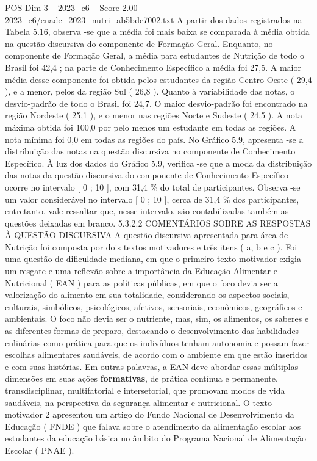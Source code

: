 \begin{textsample}{POS Dim 3 – 2023\_c6 – Score 2.00 – 2023\_c6/enade\_2023\_nutri\_ab5bde7002.txt}
A partir dos dados registrados na Tabela 5.16, observa -se que a média foi mais baixa se comparada à média obtida na questão discursiva do componente de Formação Geral.
Enquanto, no componente de Formação Geral, a média para estudantes de Nutrição de todo o Brasil foi 42,4 ; na parte de Conhecimento Específico a média foi 27,5.
A maior média desse componente foi obtida pelos estudantes da região Centro-Oeste ( 29,4 ), e a menor, pelos da região Sul ( 26,8 ).
Quanto à variabilidade das notas, o desvio-padrão de todo o Brasil foi 24,7.
O maior desvio-padrão foi encontrado na região Nordeste ( 25,1 ), e o menor nas regiões Norte e Sudeste ( 24,5 ).
A nota máxima obtida foi 100,0 por pelo menos um estudante em todas as regiões.
A nota mínima foi 0,0 em todas as regiões do país.
No Gráfico 5.9, apresenta -se a distribuição das notas na questão discursiva no componente de Conhecimento Específico.
À luz dos dados do Gráfico 5.9, verifica -se que a moda da distribuição das notas da questão discursiva do componente de Conhecimento Específico ocorre no intervalo [ 0 ; 10 ], com 31,4 \% do total de participantes.
Observa -se um valor considerável no intervalo [ 0 ; 10 ], cerca de 31,4 \% dos participantes, entretanto, vale ressaltar que, nesse intervalo, são contabilizadas também as questões deixadas em branco. 5.3.2.2 COMENTÁRIOS SOBRE AS RESPOSTAS À QUESTÃO DISCURSIVA A questão discursiva apresentada para área de Nutrição foi composta por dois textos motivadores e três itens ( a, b e c ).
Foi uma questão de dificuldade mediana, em que o primeiro texto motivador exigia um resgate e uma reflexão sobre a importância da Educação Alimentar e Nutricional ( EAN ) para as políticas públicas, em que o foco devia ser a valorização do alimento em sua totalidade, considerando os aspectos sociais, culturais, simbólicos, psicológicos, afetivos, sensoriais, econômicos, geográficos e ambientais.
O foco não devia ser o nutriente, mas, sim, os alimentos, os saberes e as diferentes formas de preparo, destacando o desenvolvimento das habilidades culinárias como prática para que os indivíduos tenham autonomia e possam fazer escolhas alimentares saudáveis, de acordo com o ambiente em que estão inseridos e com suas histórias.
Em outras palavras, a EAN deve abordar essas múltiplas dimensões em suas ações \textbf{formativas}, de prática contínua e permanente, transdisciplinar, multifatorial e intersetorial, que promovam modos de vida saudáveis, na perspectiva da segurança alimentar e nutricional.
O texto motivador 2 apresentou um artigo do Fundo Nacional de Desenvolvimento da Educação ( FNDE ) que falava sobre o atendimento da alimentação escolar aos estudantes da educação básica no âmbito do Programa Nacional de Alimentação Escolar ( PNAE ).

\end{textsample}
